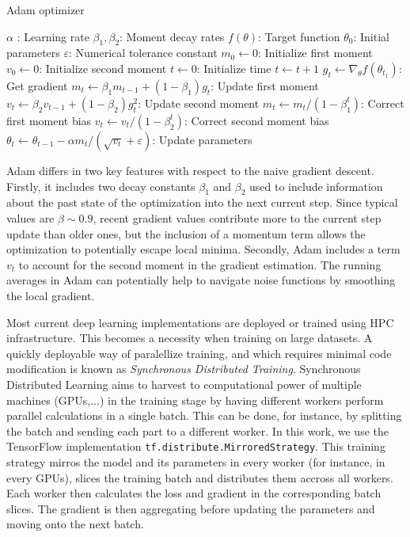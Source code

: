 \begin{algorithm}
    \caption{Adam optimizer}\label{alg:adam}
    \begin{algorithmic}
            \Require $\alpha$ : Learning rate
            \Require $\beta_1, \beta_2$: Moment decay rates
            \Require $f(\theta)$: Target function
            \Require $\theta_0$: Initial parameters
            \Require $\varepsilon$: Numerical tolerance constant
            \State $m_0 \gets 0$: Initialize first moment
            \State $v_0 \gets 0$: Initialize second moment
            \State $t \gets 0$: Initialize time
                \State $t \gets t+1$
                \State $g_t \gets \nabla_\theta f(\theta_{t_1})$: Get gradient
                \State $m_t \gets \beta_1 m_{t-1}+(1-\beta_1)g_t$: Update first moment
                \State $v_t \gets \beta_2 v_{t-1}+(1-\beta_2)g_t^2$: Update second moment
                \State $m_t \gets m_t/(1-\beta_1^t)$: Correct first moment bias
                \State $v_t \gets v_t/(1-\beta_2^t)$: Correct second moment bias
                \State $\theta_t \gets \theta_{t-1}-\alpha m_t/(\sqrt{v_t}+\varepsilon)$: Update parameters
            \EndWhile


    \end{algorithmic}
\end{algorithm}
Adam differs in two key features with respect to the naive gradient descent. Firstly, it includes two decay constants $\beta_1$ and $\beta_2$ used to include information about the past state of the optimization into the next current step. Since typical values are $\beta \sim 0.9$, recent gradient values contribute more to the current step update than older ones, but the inclusion of a momentum term allows the optimization to potentially escape local minima. Secondly, Adam includes a term $v_t$ to account for the second moment in the gradient estimation. The running averages in Adam can potentially help to navigate noise functions by smoothing the local gradient.


Most current deep learning implementations are deployed or trained using HPC infrastructure. This becomes a necessity when training on large datasets. A quickly deployable way of paralellize training, and which requires minimal code modification is known as \emph{Synchronous Distributed Training}. Synchronous Distributed Learning aims to harvest to computational power of multiple machines (GPUs,...) in the training stage by having different workers perform parallel calculations in a single batch. This can be done, for instance, by splitting the batch and sending each part to a different worker. In this work, we use the TensorFlow implementation \texttt{tf.distribute.MirroredStrategy}. This training strategy mirros the model and its parameters in every worker (for instance, in every GPUs), slices the training batch and distributes them accross all workers. Each worker then calculates the loss and gradient in the corresponding batch slices. The gradient is then aggregating before updating the parameters and moving onto the next batch.

